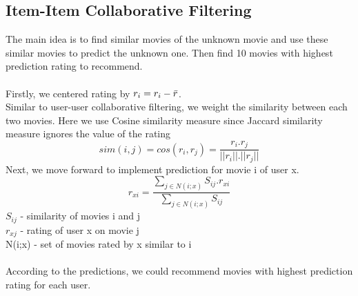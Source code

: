 \documentclass[sigconf]{acmart}
\begin{document}
\subsection{Item-Item Collaborative Filtering}
The main idea is to find similar movies of the unknown movie and use these similar movies to predict the unknown one. Then find 10 movies with highest prediction rating to recommend.\\
\\
Firstly, we centered rating by $r_i = r_i - \Bar{r}$.\\
Similar to user-user collaborative filtering, we weight the similarity between each two movies. Here we use Cosine similarity measure since Jaccard similarity measure ignores the value of the rating\\
\begin{equation} 
sim(i,j)=cos(r_i,r_j)=\frac{r_i.r_j}{||r_i||.||r_j||}
\end{equation} 
Next, we move forward to implement prediction for movie i of user x.\\
\begin{equation} 
r_{xi}=\frac{\sum_{j\in N(i;x)}S_{ij}.r_{xi}}{\sum_{j\in N(i;x)}S_{ij}}
\end{equation} 
$S_{ij}$ - similarity of movies i and j\\
$r_{xj}$ - rating of user x on movie j\\
N(i;x) - set of movies rated by x similar to i\\
\\
According to the predictions, we could recommend movies with highest prediction rating for each user.\\
\end{document}
